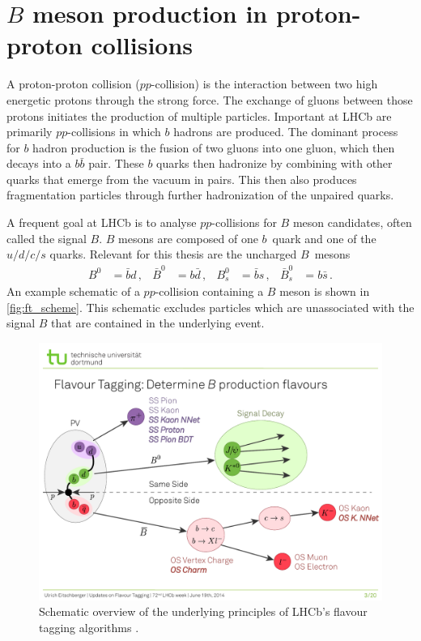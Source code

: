 \section{$B$ meson production in proton-proton collisions}

A proton-proton collision ($pp$-collision) is the interaction between two high energetic protons through the strong force.
The exchange of gluons between those protons initiates the production of multiple particles. 
Important at LHCb are primarily $pp$-collisions in which $b$ hadrons are produced.
The dominant process for $b$ hadron production is the fusion of two gluons into one gluon, which then decays into a $b\bar{b}$ pair.
These $b$ quarks then hadronize by combining with other quarks that emerge from the vacuum in pairs.
This then also produces fragmentation particles through further hadronization of the unpaired quarks.

A frequent goal at LHCb is to analyse $pp$-collisions for $B$ meson candidates, often called the signal $B$.
$B$ mesons are composed of one $b$~quark and one of the $u/d/c/s$ quarks.
Relevant for this thesis are the uncharged $B$~mesons
\begin{align*}
    B^0 &= \bar{b}d \, , & \bar{B}^0 &= b\bar{d} \, , & B_s^0 &= \bar{b}s \, , & \bar{B}_s^0 &= b\bar{s} \, .
\end{align*}
An example schematic of a $pp$-collision containing a $B$ meson is shown in \autoref{fig:ft_scheme}. 
This schematic excludes particles which are unassociated with the signal $B$ that are contained in the underlying event.

\begin{figure}
    \centering
    \includegraphics[width=\textwidth]{images/FlavourTaggingScheme.pdf}
    \caption{Schematic overview of the underlying principles of LHCb's flavour tagging algorithms \cite{ft_scheme}.}
    \label{fig:ft_scheme}
\end{figure}

